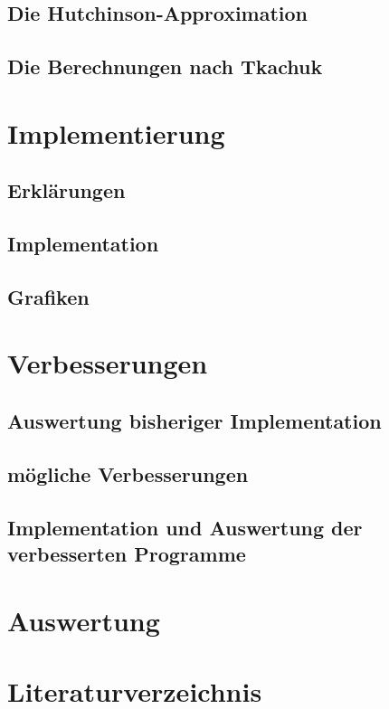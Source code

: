 \documentclass[ngerman,BCOR=4mm]{tudscrreprt}
\theoremstyle{plain} %
\theoremstyle{definition} %
\theoremstyle{remark}
\begin{document}
      \section{Die Hutchinson-Approximation}

      \section{Die Berechnungen nach Tkachuk}

\chapter{Implementierung}
\label{sec: Programmieren}
      \section{Erklärungen}

      \section{Implementation}

      \section{Grafiken}

\chapter{Verbesserungen}
\label{sec: Verbesserungen}
      \section{Auswertung bisheriger Implementation}

      \section{mögliche Verbesserungen}

      \section{Implementation und Auswertung der verbesserten Programme}

\chapter{Auswertung}
\label{sec: Auswertung}

\chapter{Literaturverzeichnis}
      \printbibliography
\end{document}
